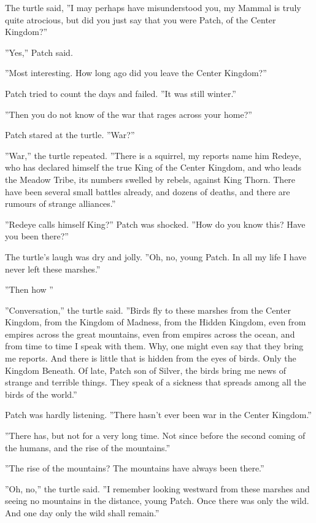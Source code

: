 \documentclass[12pt]{book}
\begin{document}
The turtle said, ''I may perhaps have misunderstood you, my Mammal is truly quite atrocious, but did you just say that you were Patch, of the Center Kingdom?''

''Yes,'' Patch said.

''Most interesting. How long ago did you leave the Center Kingdom?''

Patch tried to count the days and failed. ''It was still winter.''

''Then you do not know of the war that rages across your home?''

Patch stared at the turtle. ''War?''

''War,'' the turtle repeated. ''There is a squirrel, my reports name him Redeye, who has declared himself the true King of the Center Kingdom, and who leads the Meadow Tribe, its numbers swelled by rebels, against King Thorn. There have been several small battles already, and dozens of deaths, and there are rumours of strange alliances.''

''Redeye calls himself King?'' Patch was shocked. ''How do you know this? Have you been there?''

The turtle's laugh was dry and jolly. ''Oh, no, young Patch. In all my life I have never left these marshes.''

''Then how %
''

''Conversation,'' the turtle said. ''Birds fly to these marshes from the Center Kingdom, from the Kingdom of Madness, from the Hidden Kingdom, even from empires across the great mountains, even from empires across the ocean, and from time to time I speak with them. Why, one might even say that they bring me reports. And there is little that is hidden from the eyes of birds. Only the Kingdom Beneath. Of late, Patch son of Silver, the birds bring me news of strange and terrible things. They speak of a sickness that spreads among all the birds of the world.''

Patch was hardly listening. ''There hasn't ever been war in the Center Kingdom.''

''There has, but not for a very long time. Not since before the second coming of the humans, and the rise of the mountains.''

''The rise of the mountains? The mountains have always been there.''

''Oh, no,'' the turtle said. ''I remember looking westward from these marshes and seeing no mountains in the distance, young Patch. Once there was only the wild. And one day only the wild shall remain.''
\end{document}
